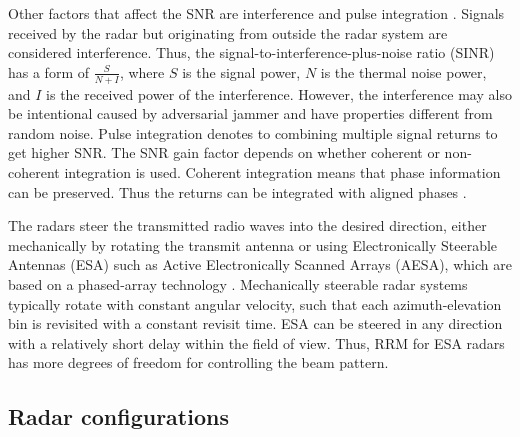 \documentclass[english, 12pt, a4paper, elec, utf8, a-1b, online]{aaltothesis}
\numberwithin{equation}{section}
\begin{document}
Other factors that affect the SNR are interference and pulse integration \cite{Curry2011}.
Signals received by the radar but originating from outside the radar system are considered interference.
Thus, the signal-to-interference-plus-noise ratio (SINR) has a form of $\frac{S}{N+I}$, where
$S$ is the signal power,
$N$ is the thermal noise power, and
$I$ is the received power of the interference.
However, the interference may also be intentional caused by adversarial jammer and have properties different from random noise. 
Pulse integration denotes to combining multiple signal returns to get higher SNR.
The SNR gain factor depends on whether coherent or non-coherent integration is used.
Coherent integration means that phase information can be preserved. 
Thus the returns can be integrated with aligned phases \cite{Curry2011}.

The radars steer the transmitted radio waves into the desired direction, either mechanically by rotating the transmit antenna \cite{Curry2011} or using Electronically Steerable Antennas (ESA) such as Active Electronically Scanned Arrays (AESA), which are based on a phased-array technology \cite{Mailloux2017}.
Mechanically steerable radar systems typically rotate with constant angular velocity, such that each azimuth-elevation bin is revisited with a constant revisit time.
ESA can be steered in any direction with a relatively short delay within the field of view.
Thus, RRM for ESA radars has more degrees of freedom for controlling the beam pattern.


\subsection{Radar configurations} \label{sec:radar_types}
\end{document}
